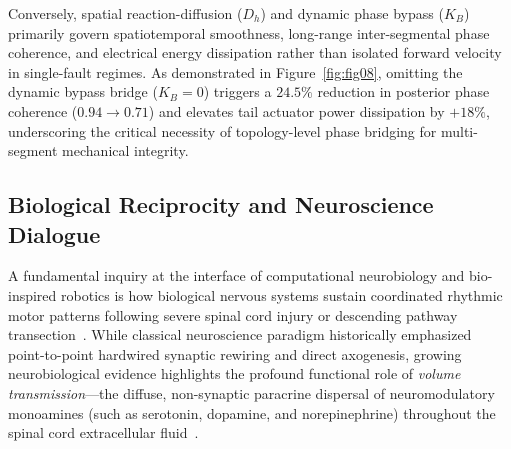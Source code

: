 \documentclass{iopjournal}
\begin{document}
Conversely, spatial reaction-diffusion ($D_h$) and dynamic phase bypass ($K_B$) primarily govern spatiotemporal smoothness, long-range inter-segmental phase coherence, and electrical energy dissipation rather than isolated forward velocity in single-fault regimes. As demonstrated in Figure~\ref{fig:fig08}, omitting the dynamic bypass bridge ($K_B=0$) triggers a $24.5\%$ reduction in posterior phase coherence ($0.94 \to 0.71$) and elevates tail actuator power dissipation by $+18\%$, underscoring the critical necessity of topology-level phase bridging for multi-segment mechanical integrity.

\subsection{Biological Reciprocity and Neuroscience Dialogue}

A fundamental inquiry at the interface of computational neurobiology and bio-inspired robotics is how biological nervous systems sustain coordinated rhythmic motor patterns following severe spinal cord injury or descending pathway transection~\cite{courtine2008,bargmann2012,courtine2009}. While classical neuroscience paradigm historically emphasized point-to-point hardwired synaptic rewiring and direct axogenesis, growing neurobiological evidence highlights the profound functional role of \textit{volume transmission}—the diffuse, non-synaptic paracrine dispersal of neuromodulatory monoamines (such as serotonin, dopamine, and norepinephrine) throughout the spinal cord extracellular fluid~\cite{bargmann2012,sillar2014,marder2006}.
\end{document}
